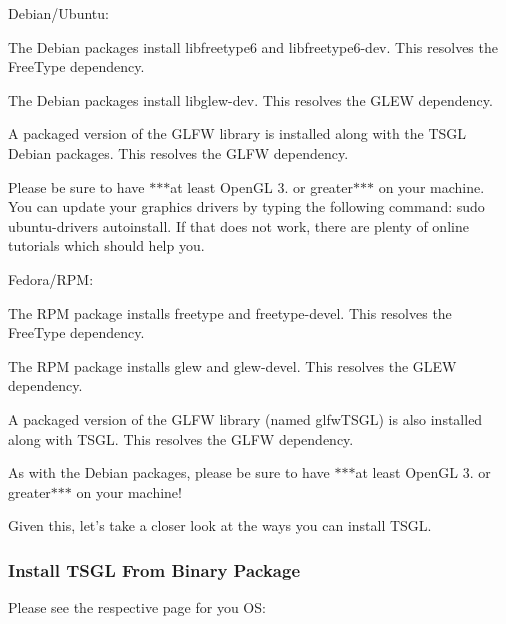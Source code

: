 \begin{DoxyItemize}
\item Debian/\-Ubuntu\-:
\begin{DoxyItemize}
\item The Debian packages install {\ttfamily libfreetype6} and {\ttfamily libfreetype6-\/dev}. This resolves the Free\-Type dependency.
\item The Debian packages install {\ttfamily libglew-\/dev}. This resolves the G\-L\-E\-W dependency.
\item A packaged version of the {\ttfamily G\-L\-F\-W} library is installed along with the T\-S\-G\-L Debian packages. This resolves the G\-L\-F\-W dependency.
\item Please be sure to have $\ast$$\ast$$\ast$at least Open\-G\-L 3. or greater$\ast$$\ast$$\ast$ on your machine. You can update your graphics drivers by typing the following command\-: {\ttfamily sudo ubuntu-\/drivers autoinstall}. If that does not work, there are plenty of online tutorials which should help you.
\end{DoxyItemize}
\item Fedora/\-R\-P\-M\-:
\begin{DoxyItemize}
\item The R\-P\-M package installs {\ttfamily freetype} and {\ttfamily freetype-\/devel}. This resolves the Free\-Type dependency.
\item The R\-P\-M package installs {\ttfamily glew} and {\ttfamily glew-\/devel}. This resolves the G\-L\-E\-W dependency.
\item A packaged version of the {\ttfamily G\-L\-F\-W} library (named {\ttfamily glfw\-T\-S\-G\-L}) is also installed along with T\-S\-G\-L. This resolves the G\-L\-F\-W dependency.
\item As with the Debian packages, please be sure to have $\ast$$\ast$$\ast$at least Open\-G\-L 3. or greater$\ast$$\ast$$\ast$ on your machine!
\end{DoxyItemize}
\end{DoxyItemize}

Given this, let's take a closer look at the ways you can install T\-S\-G\-L.

\subsubsection*{Install T\-S\-G\-L From Binary Package}

Please see the respective page for you O\-S\-:


